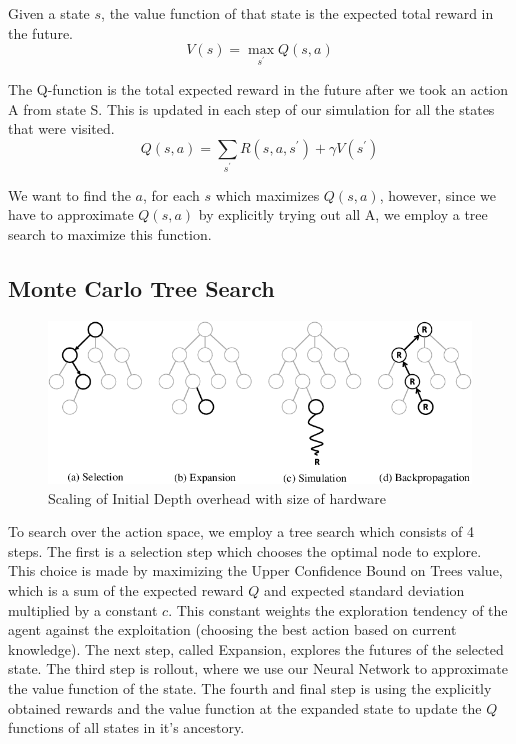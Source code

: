 \documentclass[%
 reprint,
 amsmath,amssymb,
 aps,
]{revtex4-2}
\begin{document}
Given a state $s$, the value function of that state is the expected total reward in the future.
\begin{equation}
    V(s) = \max_{s^\prime} Q(s, a)
\end{equation}

The Q-function is the total expected reward in the future after we took an action A from state S. This is updated in each step of our simulation for all the states that were visited.
\begin{equation}
    Q(s, a) = \sum_{s^\prime} R(s, a, s^\prime) + \gamma V(s^\prime)
\end{equation}

We want to find the $a$, for each $s$ which maximizes $Q(s, a)$, however, since we have to approximate $Q(s, a)$ by explicitly trying out all A, we employ a tree search to maximize this function.

\subsection{\label{sec:method-mcts}Monte Carlo Tree Search}

\begin{figure}[H]
    \includegraphics[width=\linewidth]{images/mcts-explainer.jpg}
    \caption{\label{fig:mcts-explainer}
        Scaling of Initial Depth overhead with size of hardware}
\end{figure}

To search over the action space, we employ a tree search which consists of 4 steps. The first is a selection step which chooses the optimal node to explore. This choice is made by maximizing the Upper Confidence Bound on Trees value, which is a sum of the expected reward $Q$ and expected standard deviation multiplied by a constant $c$. This constant weights the exploration tendency of the agent against the exploitation (choosing the best action based on current knowledge). The next step, called Expansion, explores the futures of the selected state. The third step is rollout, where we use our Neural Network to approximate the value function of the state. The fourth and final step is using the explicitly obtained rewards and the value function at the expanded state to update the $Q$ functions of all states in it's ancestory. 
\end{document}
